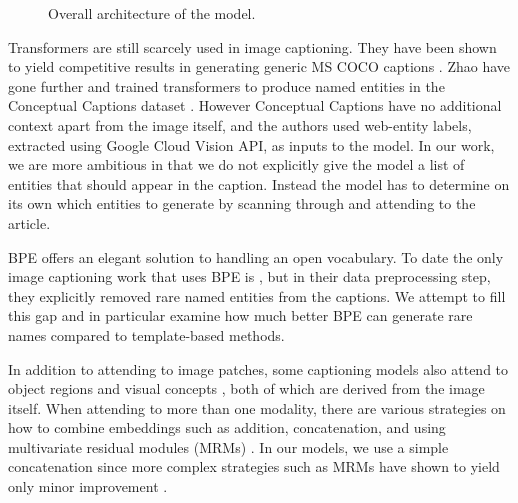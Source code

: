 \begin{figure*}[t]
    \begin{center}
    \fbox{\rule{0pt}{2in} \rule{.9\linewidth}{0pt}}
    \end{center}
       \caption{Overall architecture of the model.}
    \label{fig:short}
 \end{figure*}


Transformers are still scarcely used in image captioning. They have been shown
to yield competitive results in generating generic MS COCO captions
\cite{Zhu2018CaptioningTW, Li2019Boosted}. Zhao \etal
\cite{Zhao2019InformativeIC} have gone further and trained transformers to
produce named entities in the Conceptual Captions dataset
\cite{Sharma2018ConceptualCA}. However Conceptual Captions have no additional
context apart from the image itself, and the authors used web-entity labels,
extracted using Google Cloud Vision API, as inputs to the model. In our work,
we are more ambitious in that we do not explicitly give the model a list of
entities that should appear in the caption. Instead the model has to determine
on its own which entities to generate by scanning through and attending to the
article.

BPE offers an elegant solution to handling an open vocabulary. To date the only
image captioning work that uses BPE is \cite{Sharma2018ConceptualCA}, but in
their data preprocessing step, they explicitly removed rare named entities from
the captions. We attempt to fill this gap and in particular examine how much
better BPE can generate rare names compared to template-based methods.

In addition to attending to image patches, some captioning models also attend
to object regions \cite{Wang2019Hierarchical} and visual concepts
\cite{You2016ImageCW,Li2019Boosted,Wang2019Hierarchical}, both of which are
derived from the image itself. When attending to more than one modality, there
are various strategies on how to combine embeddings such as addition,
concatenation, and using multivariate residual modules (MRMs)
\cite{Kim2016MultimodalRL}. In our models, we use a simple concatenation since
more complex strategies such as MRMs have shown to yield only minor improvement
\cite{Wang2019Hierarchical}.
